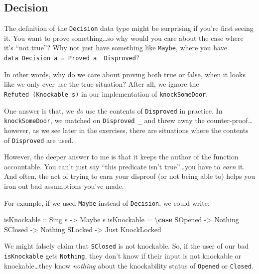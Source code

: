 \documentclass[]{article}
\newenvironment{Shaded}{}{}
\newcommand{\DataTypeTok}[1]{\textcolor[rgb]{0.56,0.13,0.00}{#1}}
\newcommand{\FunctionTok}[1]{\textcolor[rgb]{0.02,0.16,0.49}{#1}}
\newcommand{\KeywordTok}[1]{\textcolor[rgb]{0.00,0.44,0.13}{\textbf{#1}}}
\newcommand{\NormalTok}[1]{#1}
\newcommand{\OtherTok}[1]{\textcolor[rgb]{0.00,0.44,0.13}{#1}}
\begin{document}
\hypertarget{decision}{%
\subsection{Decision}\label{decision}}

The definition of the \texttt{Decision} data type might be surprising if you're
first seeing it. You want to prove something\ldots{}so why would you care about
the case where it's ``not true''? Why not just have something like
\texttt{Maybe}, where you have
\texttt{data\ Decision\ a\ =\ Proved\ a\ \textbar{}\ Disproved}?

In other words, why do we care about proving both true or false, when it looks
like we only ever use the true situation? After all, we ignore the
\texttt{Refuted\ (Knockable\ s)} in our implementation of
\texttt{knockSomeDoor}.

One answer is that, we \emph{do} use the contents of \texttt{Disproved} in
practice. In \texttt{knockSomeDoor}, we matched on \texttt{Disproved\ \_} and
threw away the counter-proof\ldots{}however, as we see later in the exercises,
there are situations where the contents of \texttt{Disproved} are used.

However, the deeper answer to me is that it keeps the author of the function
accountable. You can't just say ``this predicate isn't true''\ldots{}you have to
\emph{earn} it. And often, the act of trying to earn your disproof (or not being
able to) helps you iron out bad assumptions you've made.

For example, if we used \texttt{Maybe} instead of \texttt{Decision}, we could
write:

\begin{Shaded}
\begin{Highlighting}[]
\OtherTok{isKnockable ::} \DataTypeTok{Sing}\NormalTok{ s }\OtherTok{->} \DataTypeTok{Maybe}\NormalTok{ s}
\NormalTok{isKnockable }\FunctionTok{=}\NormalTok{ \textbackslash{}}\KeywordTok{case}
    \DataTypeTok{SOpened} \OtherTok{->} \DataTypeTok{Nothing}
    \DataTypeTok{SClosed} \OtherTok{->} \DataTypeTok{Nothing}
    \DataTypeTok{SLocked} \OtherTok{->} \DataTypeTok{Just} \DataTypeTok{KnockLocked}
\end{Highlighting}
\end{Shaded}

We might falsely claim that \texttt{SClosed} is not knockable. So, if the user
of our bad \texttt{isKnockable} gets \texttt{Nothing}, they don't know if their
input is not knockable or knockable\ldots{}they know \emph{nothing} about the
knockability status of \texttt{\textquotesingle{}Opened} or
\texttt{\textquotesingle{}Closed}.
\end{document}
